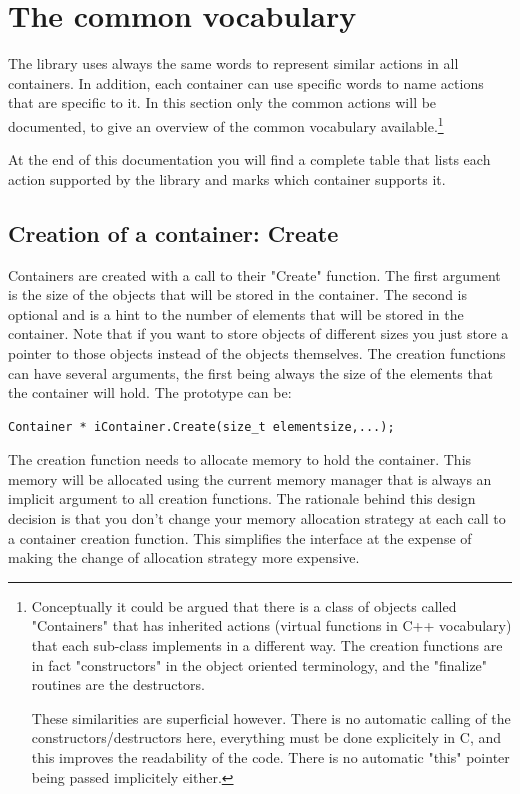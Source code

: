 \documentclass[12pt,a4paper,openany]{memoir} %
\begin{document}
\chapter{The common vocabulary}
The library uses always the same words to represent similar actions in all containers. In addition, each container can use specific words to name actions that are specific to it. In this section only the common actions will be documented, to give an overview of the common vocabulary available.\footnote{Conceptually it could be argued that there is a class of objects called "Containers" that has inherited actions (virtual functions in C++ vocabulary) that each sub-class implements in a different way. The creation functions are in fact "constructors" in the object oriented terminology, and the "finalize" routines are the destructors. 

These similarities are superficial however. There is no automatic calling of the constructors/destructors here, everything must be done explicitely in C, and this improves the readability of the code. There is no automatic "this" pointer being passed implicitely either.}

At the end of this documentation you will find a complete table that lists each action supported by the library and marks which container supports it.

\section{Creation of a container: Create}
Containers are created with a call to their "Create" function.  The first argument is the size of the objects that will be stored in the container. The second is optional and is a hint to the number of elements that will be stored in the container.
Note that if you want to store objects of different sizes you just store a pointer to those objects instead of the objects themselves.
The creation functions can have several arguments, the first being always the size of the elements that the container will hold. The prototype can be:
\begin{verbatim}
Container * iContainer.Create(size_t elementsize,...);
\end{verbatim}
The creation function needs to allocate memory to hold the container. This memory will be allocated using the current memory manager that is always an implicit argument to all creation functions. The rationale behind this design decision is that you don't change your memory allocation strategy at each call to a container creation function. This simplifies the interface at the expense of making the change of allocation strategy more expensive.
\end{document}
